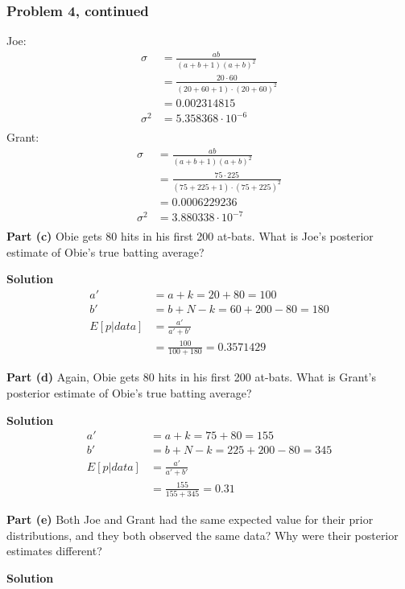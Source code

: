 \documentclass[12pt]{article}
\theoremstyle{definition}
\begin{document}
\newpage
\subsubsection*{Problem 4, continued}
Joe:
\begin{align*}
\sigma &= \frac{ab}{(a + b + 1)(a + b)^2}\\
&= \frac{20 \cdot 60}{(20 + 60 + 1)\cdot(20 + 60)^2}\\
&= 0.002314815\\
\sigma^2 &= 5.358368\cdot 10^{-6}\\
\end{align*}
Grant:
\begin{align*}
\sigma &= \frac{ab}{(a + b + 1)(a + b)^2}\\
&= \frac{75 \cdot 225}{(75 + 225 + 1)\cdot(75 + 225)^2}\\
&= 0.0006229236\\
\sigma^2 &= 3.880338\cdot 10^{-7}\\
\end{align*}
\noindent
{\bf Part (c)} Obie gets 80 hits in his first 200 at-bats. What is Joe's posterior estimate of Obie's true batting average?

\bigskip
\noindent
{\bf Solution} 
\begin{align*}
a' &= a + k = 20 + 80 = 100\\
b' &= b + N - k = 60 + 200 - 80 = 180\\
E[p|data] &= \frac{a'}{a' + b'}\\
&= \frac{100}{100 + 180} = 0.3571429
\end{align*}


\noindent
{\bf Part (d)} Again, Obie gets 80 hits in his first 200 at-bats. What is Grant's posterior estimate of Obie's true batting average?

\bigskip
\noindent
{\bf Solution} 
\begin{align*}
a' &= a + k = 75 + 80 = 155\\
b' &= b + N - k = 225 + 200 - 80 = 345\\
E[p|data] &= \frac{a'}{a' + b'}\\
&= \frac{155}{155 + 345} = 0.31
\end{align*}


\noindent
{\bf Part (e)} Both Joe and Grant had the same expected value for their prior distributions, and they both observed the same data? Why were their posterior estimates different?

\bigskip
\noindent
{\bf Solution} 
\end{document}
